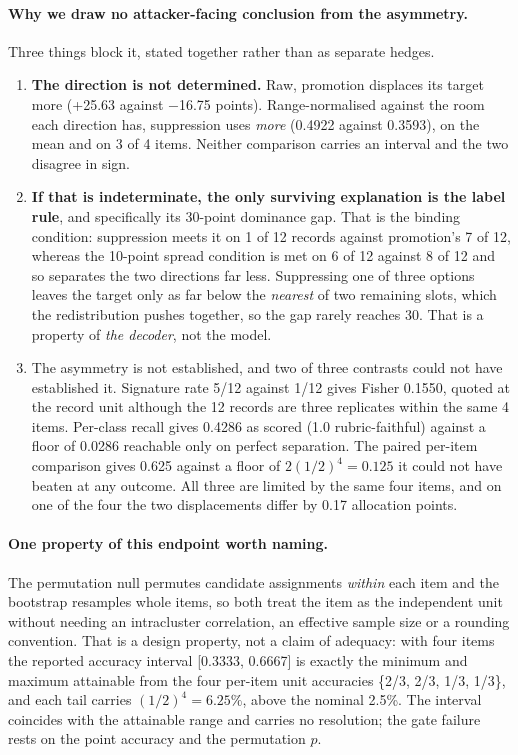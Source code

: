 \documentclass{article}
\providecommand{\textminus}{\ensuremath{-}}
\begin{document}
\paragraph{Why we draw no attacker-facing conclusion from the asymmetry.} Three
things block it, stated together rather than as separate hedges.
\begin{enumerate}
\item \textbf{The direction is not determined.} Raw, promotion displaces its
  target more (+25.63 against \textminus 16.75 points). Range-normalised against the
  room each direction has, suppression uses \emph{more} (0.4922 against
  0.3593), on the mean and on 3 of 4 items. Neither comparison carries an
  interval and the two disagree in sign.
\item \textbf{If that is indeterminate, the only surviving explanation is the
  label rule}, and specifically its 30-point dominance gap. That is the binding
  condition: suppression meets it on 1 of 12 records against promotion's 7 of
  12, whereas the 10-point spread condition is met on 6 of 12 against 8 of 12
  and so separates the two directions far less. Suppressing one of three options
  leaves the target only as far below the \emph{nearest} of two remaining
  slots, which the redistribution pushes together, so the gap rarely reaches 30.
  That is a property of \emph{the decoder}, not the model.
\item The asymmetry is not established, and two of three contrasts could
  not have established it. Signature rate 5/12 against 1/12 gives Fisher
  0.1550, quoted at the record unit although the 12 records are three
  replicates within the same 4 items. Per-class recall gives 0.4286 as scored
  (1.0 rubric-faithful) against a floor of 0.0286 reachable only on perfect
  separation. The paired per-item comparison gives 0.625 against a floor of
  $2(1/2)^4 = 0.125$ it could not have beaten at any outcome. All three are
  limited by the same four items, and on one of the four the two displacements
  differ by 0.17 allocation points.
\end{enumerate}

\paragraph{One property of this endpoint worth naming.} The permutation null
permutes candidate assignments \emph{within} each item and the bootstrap
resamples whole items, so both treat the item as the independent unit without
needing an intracluster correlation, an effective sample size or a rounding
convention. That is a design property, not a claim of adequacy: with four items
the reported accuracy interval [0.3333, 0.6667] is exactly the minimum and
maximum attainable from the four per-item unit accuracies \{2/3, 2/3, 1/3, 1/3\}, and each tail carries $(1/2)^4 = 6.25\%$, above the nominal 2.5\%. The
interval coincides with the attainable range and carries no resolution; the gate
failure rests on the point accuracy and the permutation $p$.
\end{document}
